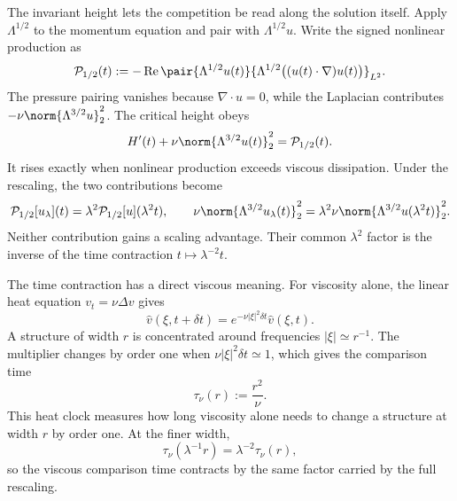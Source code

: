 
The invariant height lets the competition be read along the solution itself.
Apply \(\Lambda^{1/2}\) to the momentum equation and pair with \(\Lambda^{1/2}u\).
Write the signed nonlinear production as
\[
  \mathcal P_{1/2}(t)
  :=
  -\operatorname{Re}
  \pair
    {\Lambda^{1/2}u(t)}
    {\Lambda^{1/2}\bigl((u(t)\cdot\nabla)u(t)\bigr)}_{L^2}.
\]
The pressure pairing vanishes because \(\nabla\cdot u=0\), while the Laplacian contributes \(-\nu\norm{\Lambda^{3/2}u}_2^2\).
The critical height obeys
\[
  H'(t)
  +
  \nu\norm{\Lambda^{3/2}u(t)}_2^2
  =
  \mathcal P_{1/2}(t).
\]
It rises exactly when nonlinear production exceeds viscous dissipation.
Under the rescaling, the two contributions become
\[
  \mathcal P_{1/2}[u_\lambda](t)
  =
  \lambda^2\mathcal P_{1/2}[u](\lambda^2t),
  \qquad
  \nu\norm{\Lambda^{3/2}u_\lambda(t)}_2^2
  =
  \lambda^2\nu\norm{\Lambda^{3/2}u(\lambda^2t)}_2^2.
\]
Neither contribution gains a scaling advantage.
Their common \(\lambda^2\) factor is the inverse of the time contraction \(t\mapsto\lambda^{-2}t\).


The time contraction has a direct viscous meaning.
For viscosity alone, the linear heat equation \(v_t=\nu\Delta v\) gives
\[
  \widehat v(\xi,t+\delta t)
  =
  e^{-\nu|\xi|^2\delta t}\widehat v(\xi,t).
\]
A structure of width \(r\) is concentrated around frequencies \(|\xi|\simeq r^{-1}\).
The multiplier changes by order one when \(\nu|\xi|^2\delta t\simeq1\), which gives the comparison time
\[
  \tau_\nu(r)
  :=
  \frac{r^2}{\nu}.
\]
This heat clock measures how long viscosity alone needs to change a structure at width \(r\) by order one.
At the finer width,
\[
  \tau_\nu(\lambda^{-1}r)
  =
  \lambda^{-2}\tau_\nu(r),
\]
so the viscous comparison time contracts by the same factor carried by the full \NavierStokes{} rescaling.


